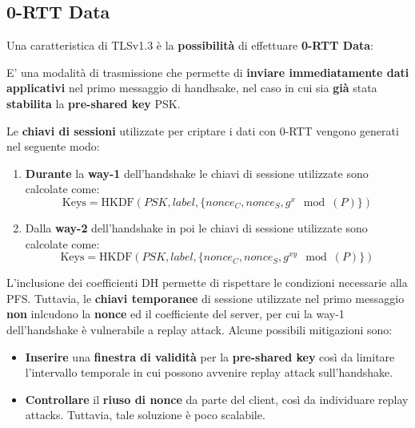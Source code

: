 \subsection{0-RTT Data}
Una caratteristica di TLSv1.3 è la \textbf{possibilità} di effettuare \textbf{0-RTT Data}:
\begin{definition}\label{def:zerortt}
E' una modalità di trasmissione che permette di \textbf{inviare immediatamente dati applicativi} nel primo messaggio di handhsake, nel caso in cui sia \textbf{già} stata \textbf{stabilita} la \textbf{pre-shared key} PSK.
\end{definition}
Le \textbf{chiavi di sessioni} utilizzate per criptare i dati con 0-RTT vengono generati nel seguente modo:
\begin{definition}\label{def:zerorttkey}
\begin{enumerate}
    \item \textbf{Durante} la \textbf{way-1} dell'handshake le chiavi di sessione utilizzate sono calcolate come:
    \[\text{Keys}=\text{HKDF}(PSK,label,\{nonce_C,nonce_S,g^{x}\mod(P)\})\]
    \item Dalla \textbf{way-2} dell'handshake in poi le chiavi di sessione utilizzate sono calcolate come:
    \[\text{Keys}=\text{HKDF}(PSK,label,\{nonce_C,nonce_S,g^{xy}\mod(P)\})\]
\end{enumerate}
\end{definition}
L'inclusione dei coefficienti DH permette di rispettare le condizioni necessarie alla PFS. Tuttavia, le \textbf{chiavi temporanee} di sessione utilizzate nel primo messaggio \textbf{non} inlcudono la \textbf{nonce} ed il coefficiente del server, per cui la way-1 dell'handshake è vulnerabile a replay attack. Alcune possibili mitigazioni sono:
\begin{itemize}
    \item \textbf{Inserire} una \textbf{finestra di validità} per la \textbf{pre-shared key} così da limitare l'intervallo temporale in cui possono avvenire replay attack sull'handshake.
    \item \textbf{Controllare} il \textbf{riuso di nonce} da parte del client, così da individuare replay attacks. Tuttavia, tale soluzione è poco scalabile.
\end{itemize}
